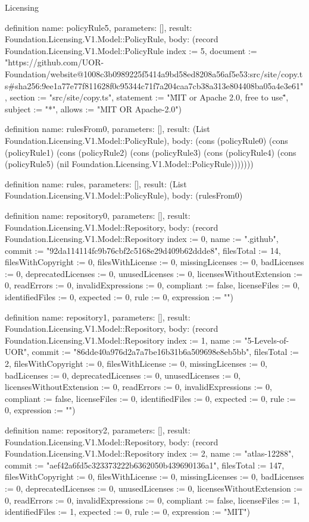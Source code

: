 \begin{lexlean}{Licensing}
\begin{semanticmodule}
definition{
  name: policyRule5,
  parameters: [],
  result: Foundation.Licensing.V1.Model::PolicyRule,
  body: (record Foundation.Licensing.V1.Model::PolicyRule {index := 5, document := "https://github.com/UOR-Foundation/website@1008c3b0989225f5414a9bd58ed8208a56af5e53:src/site/copy.ts#sha256:9ee1a77e77f811628f0c95344c71f7a204caa7cb38a313e804408ba05a4e3e61", section := "src/site/copy.ts", statement := "\"MIT or Apache 2.0, free to use\"", subject := "*", allows := "MIT OR Apache-2.0"})
}

definition{
  name: rulesFrom0,
  parameters: [],
  result: (List Foundation.Licensing.V1.Model::PolicyRule),
  body: (cons (policyRule0) (cons (policyRule1) (cons (policyRule2) (cons (policyRule3) (cons (policyRule4) (cons (policyRule5) (nil Foundation.Licensing.V1.Model::PolicyRule)))))))
}

definition{
  name: rules,
  parameters: [],
  result: (List Foundation.Licensing.V1.Model::PolicyRule),
  body: (rulesFrom0)
}

definition{
  name: repository0,
  parameters: [],
  result: Foundation.Licensing.V1.Model::Repository,
  body: (record Foundation.Licensing.V1.Model::Repository {index := 0, name := ".github", commit := "92da114114fc9b76cbf2c5168e29d409b62ddde8", filesTotal := 14, filesWithCopyright := 0, filesWithLicense := 0, missingLicenses := 0, badLicenses := 0, deprecatedLicenses := 0, unusedLicenses := 0, licensesWithoutExtension := 0, readErrors := 0, invalidExpressions := 0, compliant := false, licenseFiles := 0, identifiedFiles := 0, expected := 0, rule := 0, expression := ""})
}

definition{
  name: repository1,
  parameters: [],
  result: Foundation.Licensing.V1.Model::Repository,
  body: (record Foundation.Licensing.V1.Model::Repository {index := 1, name := "5-Levels-of-UOR", commit := "86dde40a976d2a7a7be16b31b6a509698e8eb5bb", filesTotal := 2, filesWithCopyright := 0, filesWithLicense := 0, missingLicenses := 0, badLicenses := 0, deprecatedLicenses := 0, unusedLicenses := 0, licensesWithoutExtension := 0, readErrors := 0, invalidExpressions := 0, compliant := false, licenseFiles := 0, identifiedFiles := 0, expected := 0, rule := 0, expression := ""})
}

definition{
  name: repository2,
  parameters: [],
  result: Foundation.Licensing.V1.Model::Repository,
  body: (record Foundation.Licensing.V1.Model::Repository {index := 2, name := "atlas-12288", commit := "aef42a6fd5c323373222b6362050b439690136a1", filesTotal := 147, filesWithCopyright := 0, filesWithLicense := 0, missingLicenses := 0, badLicenses := 0, deprecatedLicenses := 0, unusedLicenses := 0, licensesWithoutExtension := 0, readErrors := 0, invalidExpressions := 0, compliant := false, licenseFiles := 1, identifiedFiles := 1, expected := 0, rule := 0, expression := "MIT"})
}


\end{semanticmodule}
\end{lexlean}
